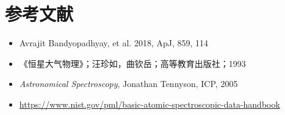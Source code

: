 \documentclass[a4paper]{article}
\begin{document}
\section*{参考文献}

\begin{itemize}
    \item Avrajit Bandyopadhyay, et al. 2018, ApJ, 859, 114
    \item 《恒星大气物理》；汪珍如，曲钦岳；高等教育出版社；1993
    \item \textit{Astronomical Spectroscopy}, Jonathan Tennyson, ICP, 2005
    \item \url{https://www.nist.gov/pml/basic-atomic-spectroscopic-data-handbook}
\end{itemize}
\end{document}
